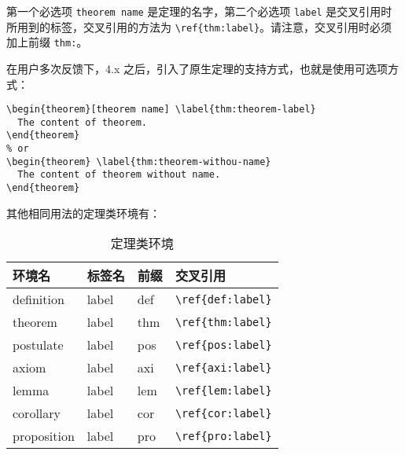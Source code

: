 第一个必选项 \lstinline{theorem name} 是定理的名字，第二个必选项 \lstinline{label} 是交叉引用时所用到的标签，交叉引用的方法为 \verb|\ref{thm:label}|。请注意，交叉引用时必须加上前缀 \lstinline{thm:}。

在用户多次反馈下，4.x 之后，引入了原生定理的支持方式，也就是使用可选项方式：

\begin{lstlisting}
\begin{theorem}[theorem name] \label{thm:theorem-label}
  The content of theorem.
\end{theorem}
% or 
\begin{theorem} \label{thm:theorem-withou-name}
  The content of theorem without name.
\end{theorem}
\end{lstlisting}

其他相同用法的定理类环境有：

\begin{table}[htbp]
   \centering
   \caption{定理类环境}
     \begin{tabular}{llll}
     \toprule
     环境名 & 标签名 & 前缀 & 交叉引用 \\
     \midrule
     definition & label & def   & \lstinline|\ref{def:label}| \\
     theorem & label & thm   & \lstinline|\ref{thm:label}| \\
     postulate & label & pos & \lstinline|\ref{pos:label}| \\
     axiom & label & axi & \lstinline|\ref{axi:label}|\\
     lemma & label & lem   & \lstinline|\ref{lem:label}| \\
     corollary & label & cor   & \lstinline|\ref{cor:label}| \\
     proposition & label & pro   & \lstinline|\ref{pro:label}| \\
     \bottomrule
     \end{tabular}%
   \label{tab:theorem-class}%
 \end{table}%
 

